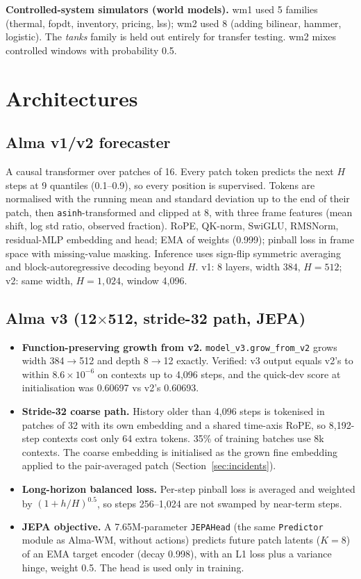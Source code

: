 \documentclass[10pt,a4paper]{extarticle}
\newcommand{\code}[1]{\texttt{\small #1}}
\begin{document}
\textbf{Controlled-system simulators (world models).} wm1 used 5 families (thermal, fopdt, inventory, pricing, lss);
wm2 used 8 (adding bilinear, hammer, logistic). The \emph{tanks} family is held out entirely for transfer testing.
wm2 mixes controlled windows with probability 0.5.

\section{Architectures}
\subsection{Alma v1/v2 forecaster}
A causal transformer over patches of 16. Every patch token predicts the next $H$ steps at 9 quantiles (0.1--0.9), so every
position is supervised. Tokens are normalised with the running mean and standard deviation up to the end of their patch,
then \code{asinh}-transformed and clipped at 8, with three frame features (mean shift, log std ratio, observed fraction).
RoPE, QK-norm, SwiGLU, RMSNorm, residual-MLP embedding and head; EMA of weights (0.999); pinball loss in frame space with
missing-value masking. Inference uses sign-flip symmetric averaging and block-autoregressive decoding beyond $H$.
v1: 8 layers, width 384, $H=512$; v2: same width, $H=1{,}024$, window 4{,}096.

\subsection{Alma v3 (12$\times$512, stride-32 path, JEPA)}
\begin{itemize}
\item \textbf{Function-preserving growth from v2.} \code{model\_v3.grow\_from\_v2} grows width 384$\to$512 and depth 8$\to$12
exactly. Verified: v3 output equals v2's to within $8.6\times10^{-6}$ on contexts up to 4{,}096 steps, and the quick-dev
score at initialisation was 0.60697 vs v2's 0.60693.
\item \textbf{Stride-32 coarse path.} History older than 4{,}096 steps is tokenised in patches of 32 with its own embedding
and a shared time-axis RoPE, so 8{,}192-step contexts cost only 64 extra tokens. 35\% of training batches use 8k contexts.
The coarse embedding is initialised as the grown fine embedding applied to the pair-averaged patch (Section~\ref{sec:incidents}).
\item \textbf{Long-horizon balanced loss.} Per-step pinball loss is averaged and weighted by $(1+h/H)^{0.5}$, so steps
256--1{,}024 are not swamped by near-term steps.
\item \textbf{JEPA objective.} A 7.65M-parameter \code{JEPAHead} (the same \code{Predictor} module as Alma-WM, without actions)
predicts future patch latents ($K=8$) of an EMA target encoder (decay 0.998), with an L1 loss plus a variance hinge,
weight 0.5. The head is used only in training.
\end{itemize}
\end{document}
